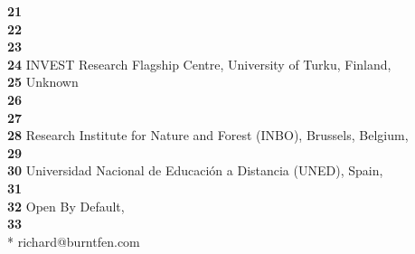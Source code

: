 \textbf{21} \\
\textbf{22} \\
\textbf{23} \\
\textbf{24} INVEST Research Flagship Centre, University of Turku, Finland, \\
\textbf{25} Unknown\\
\textbf{26} \\
\textbf{27} \\
\textbf{28} Research Institute for Nature and Forest (INBO), Brussels, Belgium, \\
\textbf{29} \\
\textbf{30} Universidad Nacional de Educación a Distancia (UNED), Spain, \\
\textbf{31} \\
\textbf{32} Open By Default, \\
\textbf{33} \\

* richard@burntfen.com
